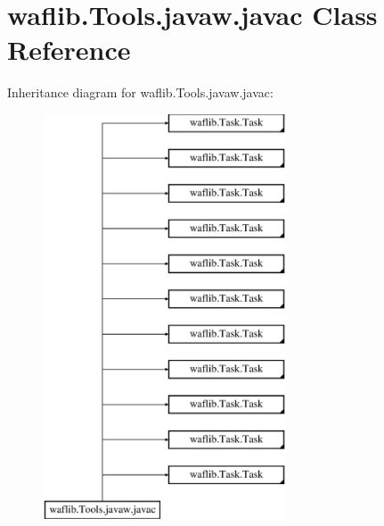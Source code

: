 \hypertarget{classwaflib_1_1_tools_1_1javaw_1_1javac}{}\section{waflib.\+Tools.\+javaw.\+javac Class Reference}
\label{classwaflib_1_1_tools_1_1javaw_1_1javac}
Inheritance diagram for waflib.\+Tools.\+javaw.\+javac\+:\begin{figure}[H]
\begin{center}
\leavevmode
\includegraphics[height=12.000000cm]{classwaflib_1_1_tools_1_1javaw_1_1javac}
\end{center}
\end{figure}
